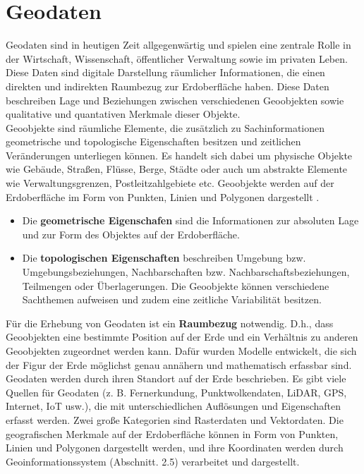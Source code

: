 \section{Geodaten}
\label{sec:Geodaten}
Geodaten sind in heutigen Zeit allgegenwärtig und spielen eine zentrale Rolle in der Wirtschaft, Wissenschaft, öffentlicher Verwaltung sowie im privaten Leben. Diese Daten sind digitale Darstellung räumlicher Informationen, die einen direkten und indirekten Raumbezug zur Erdoberfläche haben. Diese Daten beschreiben Lage und Beziehungen zwischen verschiedenen Geoobjekten sowie qualitative und quantativen Merkmale dieser Objekte.\\

Geoobjekte sind räumliche Elemente, die zusätzlich zu Sachinformationen geometrische und topologische Eigenschaften besitzen und zeitlichen Veränderungen unterliegen können. Es handelt sich dabei um physische Objekte wie Gebäude, Straßen, Flüsse, Berge, Städte oder auch um abstrakte Elemente wie Verwaltungsgrenzen, Postleitzahlgebiete etc. Geoobjekte werden auf der Erdoberfläche im Form von Punkten, Linien und Polygonen dargestellt \citep{de_lange_geoinformatik_2020}.

\begin{itemize}
    \item Die \textbf{geometrische Eigenschafen} sind die Informationen zur absoluten Lage und zur Form des Objektes auf der Erdoberfläche.
    \item Die \textbf{topologischen Eigenschaften} beschreiben Umgebung bzw. Umgebungsbeziehungen, Nachbarschaften bzw. Nachbarschaftsbeziehungen, Teilmengen oder Überlagerungen. Die Geoobjekte können verschiedene Sachthemen aufweisen und zudem eine zeitliche Variabilität besitzen.
\end{itemize}

Für die Erhebung von Geodaten ist ein \textbf{Raumbezug} notwendig. D.h., dass Geoobjekten eine bestimmte Position auf der Erde und ein Verhältnis zu anderen Geoobjekten zugeordnet werden kann. Dafür wurden Modelle entwickelt, die sich der Figur der Erde möglichst genau annähern und mathematisch erfassbar sind. \\

Geodaten werden durch ihren Standort auf der Erde beschrieben. Es gibt viele Quellen für Geodaten (z. B. Fernerkundung, Punktwolkendaten, LiDAR, GPS, Internet, IoT usw.), die mit unterschiedlichen Auflösungen und Eigenschaften erfasst werden. Zwei große Kategorien sind Rasterdaten und Vektordaten. Die geografischen Merkmale auf der Erdoberfläche können in Form von Punkten, Linien und Polygonen dargestellt werden, und ihre Koordinaten werden durch Geoinformationssystem (Abschnitt. 2.5) verarbeitet und dargestellt.\\

